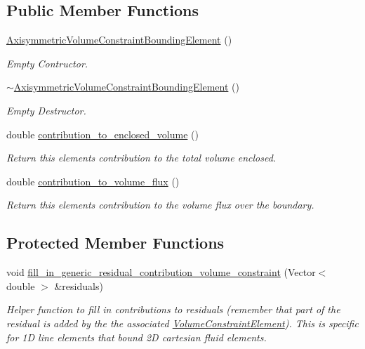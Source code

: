 \subsection*{Public Member Functions}
\begin{DoxyCompactItemize}
\item 
\hyperlink{classoomph_1_1AxisymmetricVolumeConstraintBoundingElement_a716ae91b7c11f6d71c474bec6f6d6d24}{Axisymmetric\+Volume\+Constraint\+Bounding\+Element} ()
\begin{DoxyCompactList}\small\item\em Empty Contructor. \end{DoxyCompactList}\item 
\hyperlink{classoomph_1_1AxisymmetricVolumeConstraintBoundingElement_ac7b98a2915cef69c7e4825e1f5730bc5}{$\sim$\+Axisymmetric\+Volume\+Constraint\+Bounding\+Element} ()
\begin{DoxyCompactList}\small\item\em Empty Destructor. \end{DoxyCompactList}\item 
double \hyperlink{classoomph_1_1AxisymmetricVolumeConstraintBoundingElement_a2d54cd3bce11538b066c8626b241d2c9}{contribution\+\_\+to\+\_\+enclosed\+\_\+volume} ()
\begin{DoxyCompactList}\small\item\em Return this element\textquotesingle{}s contribution to the total volume enclosed. \end{DoxyCompactList}\item 
double \hyperlink{classoomph_1_1AxisymmetricVolumeConstraintBoundingElement_a746f88f325d61610e10e97465fd2ca09}{contribution\+\_\+to\+\_\+volume\+\_\+flux} ()
\begin{DoxyCompactList}\small\item\em Return this element\textquotesingle{}s contribution to the volume flux over the boundary. \end{DoxyCompactList}\end{DoxyCompactItemize}
\subsection*{Protected Member Functions}
\begin{DoxyCompactItemize}
\item 
void \hyperlink{classoomph_1_1AxisymmetricVolumeConstraintBoundingElement_a2a3f3b86079f27d52679f357f5276d91}{fill\+\_\+in\+\_\+generic\+\_\+residual\+\_\+contribution\+\_\+volume\+\_\+constraint} (Vector$<$ double $>$ \&residuals)
\begin{DoxyCompactList}\small\item\em Helper function to fill in contributions to residuals (remember that part of the residual is added by the the associated \hyperlink{classoomph_1_1VolumeConstraintElement}{Volume\+Constraint\+Element}). This is specific for 1D line elements that bound 2D cartesian fluid elements. \end{DoxyCompactList}\end{DoxyCompactItemize}
